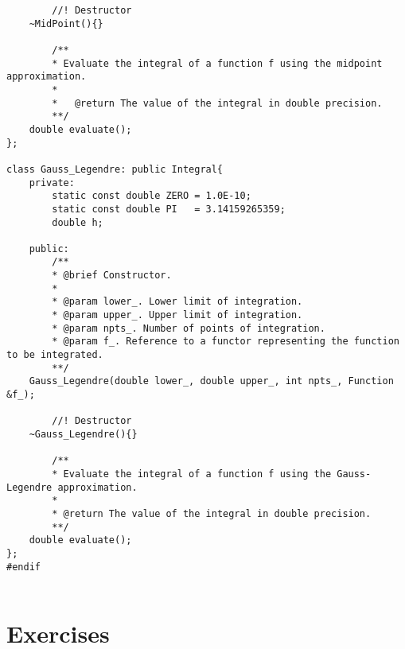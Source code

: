 \begin{lstlisting}
		//! Destructor
    ~MidPoint(){}
		
		/**
		* Evaluate the integral of a function f using the midpoint approximation.
		*
		*	@return The value of the integral in double precision.
		**/
    double evaluate();
};

class Gauss_Legendre: public Integral{
	private:
		static const double ZERO = 1.0E-10;
		static const double PI	 = 3.14159265359; 
		double h;
		
	public:
		/**
		* @brief Constructor.
		*
		* @param lower_. Lower limit of integration.
		* @param upper_. Upper limit of integration.
		* @param npts_. Number of points of integration.
		* @param f_. Reference to a functor representing the function to be integrated.
		**/
    Gauss_Legendre(double lower_, double upper_, int npts_, Function &f_);
    
		//! Destructor
    ~Gauss_Legendre(){}
		
		/** 
		* Evaluate the integral of a function f using the Gauss-Legendre approximation.
		*
		* @return The value of the integral in double precision.
		**/
    double evaluate();
};
#endif


\end{lstlisting}
\section{Exercises}

\begin{prob}

\end{prob}
